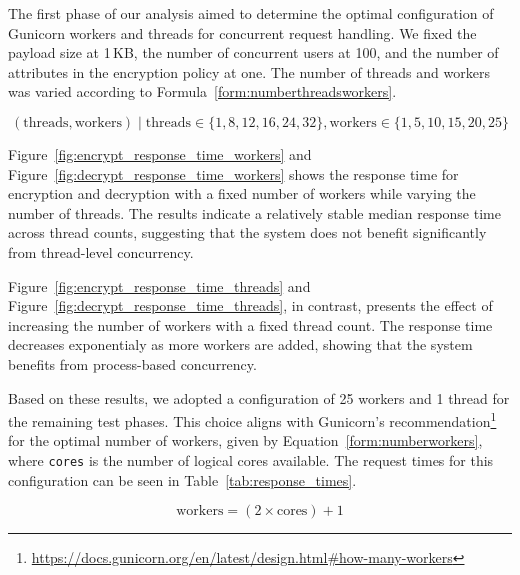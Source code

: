 \documentclass[cic,tc,english]{iiufrgs}
\numberwithin{algorithm}{chapter}
\begin{document}
        The first phase of our analysis aimed to determine the optimal configuration of Gunicorn workers and threads for concurrent request handling. We fixed the payload size at 1\,KB, the number of concurrent users at 100, and the number of attributes in the encryption policy at one. The number of threads and workers was varied according to Formula~\ref{form:numberthreadsworkers}.

        \begin{equation}
            \label{form:numberthreadsworkers}
            (\text{threads}, \text{workers}) \mid \text{threads} \in \{1, 8, 12, 16, 24, 32\}, \text{workers} \in \{1, 5, 10, 15, 20, 25\} 
        \end{equation}

        Figure~\ref{fig:encrypt_response_time_workers} and Figure~\ref{fig:decrypt_response_time_workers} shows the response time for encryption and decryption with a fixed number of workers while varying the number of threads. The results indicate a relatively stable median response time across thread counts, suggesting that the system does not benefit significantly from thread-level concurrency.

        Figure~\ref{fig:encrypt_response_time_threads} and Figure~\ref{fig:decrypt_response_time_threads}, in contrast, presents the effect of increasing the number of workers with a fixed thread count. The response time decreases exponentialy as more workers are added, showing that the system benefits from process-based concurrency.

        Based on these results, we adopted a configuration of 25 workers and 1 thread for the remaining test phases. This choice aligns with Gunicorn's recommendation\footnote{\url{https://docs.gunicorn.org/en/latest/design.html\#how-many-workers}} for the optimal number of workers, given by Equation~\ref{form:numberworkers}, where \texttt{cores} is the number of logical cores available. The request times for this configuration can be seen in Table~\ref{tab:response_times}.

        \begin{equation}
            \label{form:numberworkers}
            \text{workers} = (2 \times \text{cores}) + 1
        \end{equation}
\end{document}
